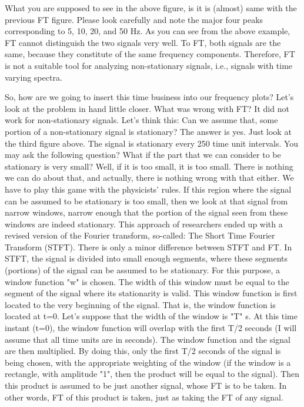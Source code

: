 \documentclass[12pt, a4paper, twoside]{report}
\begin{document}
What you are supposed to see in the above figure, is it is (almost) same with the previous FT figure. Please look carefully and note the major four peaks corresponding to 5, 10, 20, and 50 Hz. As you can see from the above example, FT cannot distinguish the two signals very well. To FT, both signals are the same, because they constitute of the same frequency components. Therefore, FT is not a suitable tool for analyzing non-stationary signals, i.e., signals with time varying spectra.
\par
So, how are we going to insert this time business into our frequency plots? Let's look at the problem in hand little closer. 
What was wrong with FT? It did not work for non-stationary signals. Let's think this: Can we assume that, some portion of a non-stationary signal is stationary? 
The answer is yes. 
Just look at the third figure above. The signal is stationary every 250 time unit intervals. 
You may ask the following question? 
What if the part that we can consider to be stationary is very small? 
Well, if it is too small, it is too small. There is nothing we can do about that, and actually, there is nothing wrong with that either. We have to play this game with the physicists' rules. 
If this region where the signal can be assumed to be stationary is too small, then we look at that signal from narrow windows, narrow enough that the portion of the signal seen from these windows are indeed stationary. 
This approach of researchers ended up with a revised version of the Fourier transform, so-called: The Short Time Fourier Transform (STFT).
There is only a minor difference between STFT and FT. In STFT, the signal is divided into small enough segments, where these segments (portions) of the signal can be assumed to be stationary. For this purpose, a window function "w" is chosen. The width of this window must be equal to the segment of the signal where its stationarity is valid.
This window function is first located to the very beginning of the signal. That is, the window function is located at t=0. Let's suppose that the width of the window is "T" s. At this time instant (t=0), the window function will overlap with the first T/2 seconds (I will assume that all time units are in seconds). The window function and the signal are then multiplied. By doing this, only the first T/2 seconds of the signal is being chosen, with the appropriate weighting of the window (if the window is a rectangle, with amplitude "1", then the product will be equal to the signal). Then this product is assumed to be just another signal, whose FT is to be taken. In other words, FT of this product is taken, just as taking the FT of any signal. 
\end{document}
